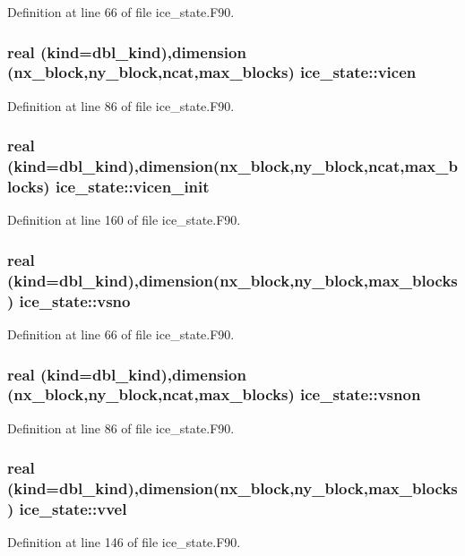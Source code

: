 Definition at line 66 of file ice\_\-state.F90.\hypertarget{namespaceice__state_aa85616e03769af4afb0166070aa7cc8f}{
\subsubsection[{vicen}]{\setlength{\rightskip}{0pt plus 5cm}real (kind=dbl\_\-kind),dimension (nx\_\-block,ny\_\-block,ncat,max\_\-blocks) {\bf ice\_\-state::vicen}}}
\label{namespaceice__state_aa85616e03769af4afb0166070aa7cc8f}


Definition at line 86 of file ice\_\-state.F90.\hypertarget{namespaceice__state_ac5cee5fad34f6b73399069dda488adab}{
\subsubsection[{vicen\_\-init}]{\setlength{\rightskip}{0pt plus 5cm}real (kind=dbl\_\-kind),dimension(nx\_\-block,ny\_\-block,ncat,max\_\-blocks) {\bf ice\_\-state::vicen\_\-init}}}
\label{namespaceice__state_ac5cee5fad34f6b73399069dda488adab}


Definition at line 160 of file ice\_\-state.F90.\hypertarget{namespaceice__state_ac2427022070069eb40ad5d21ad7a684e}{
\subsubsection[{vsno}]{\setlength{\rightskip}{0pt plus 5cm}real (kind=dbl\_\-kind),dimension(nx\_\-block,ny\_\-block,max\_\-blocks) {\bf ice\_\-state::vsno}}}
\label{namespaceice__state_ac2427022070069eb40ad5d21ad7a684e}


Definition at line 66 of file ice\_\-state.F90.\hypertarget{namespaceice__state_acd313a058964928092cbc75f7689cef5}{
\subsubsection[{vsnon}]{\setlength{\rightskip}{0pt plus 5cm}real (kind=dbl\_\-kind),dimension (nx\_\-block,ny\_\-block,ncat,max\_\-blocks) {\bf ice\_\-state::vsnon}}}
\label{namespaceice__state_acd313a058964928092cbc75f7689cef5}


Definition at line 86 of file ice\_\-state.F90.\hypertarget{namespaceice__state_ae19e42c4089f6a3a8426fb5847cf748e}{
\subsubsection[{vvel}]{\setlength{\rightskip}{0pt plus 5cm}real (kind=dbl\_\-kind),dimension(nx\_\-block,ny\_\-block,max\_\-blocks) {\bf ice\_\-state::vvel}}}
\label{namespaceice__state_ae19e42c4089f6a3a8426fb5847cf748e}


Definition at line 146 of file ice\_\-state.F90.